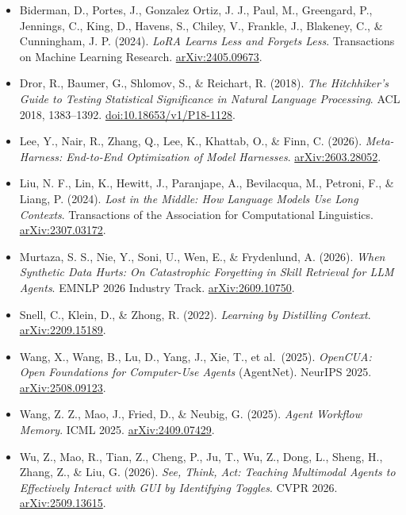 \documentclass[
  10pt,
]{article}
\providecommand{\tightlist}{%
  \setlength{\itemsep}{0pt}\setlength{\parskip}{0pt}}
\begin{document}
\begin{itemize}
\tightlist
\item
  Biderman, D., Portes, J., Gonzalez Ortiz, J. J., Paul, M., Greengard,
  P., Jennings, C., King, D., Havens, S., Chiley, V., Frankle, J.,
  Blakeney, C., \& Cunningham, J. P. (2024). \emph{LoRA Learns Less and
  Forgets Less}. Transactions on Machine Learning Research.
  \href{https://arxiv.org/abs/2405.09673}{arXiv:2405.09673}.
\item
  Dror, R., Baumer, G., Shlomov, S., \& Reichart, R. (2018). \emph{The
  Hitchhiker's Guide to Testing Statistical Significance in Natural
  Language Processing}. ACL 2018, 1383--1392.
  \href{https://aclanthology.org/P18-1128/}{doi:10.18653/v1/P18-1128}.
\item
  Lee, Y., Nair, R., Zhang, Q., Lee, K., Khattab, O., \& Finn, C.
  (2026). \emph{Meta-Harness: End-to-End Optimization of Model
  Harnesses}. \href{https://arxiv.org/abs/2603.28052}{arXiv:2603.28052}.
\item
  Liu, N. F., Lin, K., Hewitt, J., Paranjape, A., Bevilacqua, M.,
  Petroni, F., \& Liang, P. (2024). \emph{Lost in the Middle: How
  Language Models Use Long Contexts}. Transactions of the Association
  for Computational Linguistics.
  \href{https://arxiv.org/abs/2307.03172}{arXiv:2307.03172}.
\item
  Murtaza, S. S., Nie, Y., Soni, U., Wen, E., \& Frydenlund, A. (2026).
  \emph{When Synthetic Data Hurts: On Catastrophic Forgetting in Skill
  Retrieval for LLM Agents}. EMNLP 2026 Industry Track.
  \href{https://arxiv.org/abs/2609.10750}{arXiv:2609.10750}.
\item
  Snell, C., Klein, D., \& Zhong, R. (2022). \emph{Learning by
  Distilling Context}.
  \href{https://arxiv.org/abs/2209.15189}{arXiv:2209.15189}.
\item
  Wang, X., Wang, B., Lu, D., Yang, J., Xie, T., et al.~(2025).
  \emph{OpenCUA: Open Foundations for Computer-Use Agents} (AgentNet).
  NeurIPS 2025.
  \href{https://arxiv.org/abs/2508.09123}{arXiv:2508.09123}.
\item
  Wang, Z. Z., Mao, J., Fried, D., \& Neubig, G. (2025). \emph{Agent
  Workflow Memory}. ICML 2025.
  \href{https://arxiv.org/abs/2409.07429}{arXiv:2409.07429}.
\item
  Wu, Z., Mao, R., Tian, Z., Cheng, P., Ju, T., Wu, Z., Dong, L., Sheng,
  H., Zhang, Z., \& Liu, G. (2026). \emph{See, Think, Act: Teaching
  Multimodal Agents to Effectively Interact with GUI by Identifying
  Toggles}. CVPR 2026.
  \href{https://arxiv.org/abs/2509.13615}{arXiv:2509.13615}.

\end{itemize}
\end{document}
